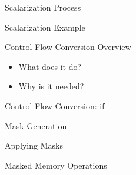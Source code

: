
\begin{frame}{Scalarization Process}


\end{frame}


\begin{frame}{Scalarization Example}


\end{frame}



\begin{frame}{Control Flow Conversion Overview}

\begin{itemize}
    \item What does it do?
    \item Why is it needed?
\end{itemize}

\end{frame}


\begin{frame}{Control Flow Conversion: if}

\end{frame}


\begin{frame}{Mask Generation}

\end{frame}


\begin{frame}{Applying Masks}

\end{frame}


\begin{frame}{Masked Memory Operations}

\end{frame}

